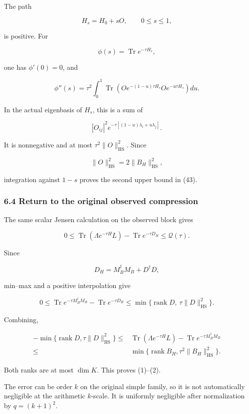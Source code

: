 \documentclass[11pt]{article}
\begin{document}
The path

\[
H_s=H_0+sO,\qquad 0\le s\le1,
\]

is positive. For

\[
\phi(s)=\operatorname{Tr}e^{-\tau H_s},
\]

one has \(\phi'(0)=0\), and

\[
\phi''(s)
=
\tau^2\int_0^1
\operatorname{Tr}
\left(
Oe^{-(1-u)\tau H_s}Oe^{-u\tau H_s}
\right)du.
\]

In the actual eigenbasis of \(H_s\), this is a sum of

\[
|O_{ij}|^2e^{-\tau[(1-u)\lambda_i+u\lambda_j]}.
\]

It is nonnegative and at most \(\tau^2\|O\|_{\mathrm{HS}}^2\). Since

\[
\|O\|_{\mathrm{HS}}^2=2\|B_H\|_{\mathrm{HS}}^2,
\]

integration against \(1-s\) proves the second upper bound in (43).

\subsubsection{6.4 Return to the original observed compression}\label{return-to-the-original-observed-compression}

The same scalar Jensen calculation on the observed block gives

\[
0\le
\operatorname{Tr}\!\left(\Lambda e^{-\tau H}L\right)
-\operatorname{Tr}e^{-\tau D_H}
\le\mathcal Q(\tau).
\tag{44}
\]

Since

\[
D_H=M_B^\dagger M_B+D^\dagger D,
\]

min--max and a positive interpolation give

\[
0\le
\operatorname{Tr}e^{-\tau M_B^\dagger M_B}
-\operatorname{Tr}e^{-\tau D_H}
\le
\min\{\operatorname{rank}D,\ \tau\|D\|_{\mathrm{HS}}^2\}.
\]

Combining,

\[
\boxed{
\begin{aligned}
-\min\{\operatorname{rank}D,\tau\|D\|_{\mathrm{HS}}^2\}
\le{}&
\operatorname{Tr}\!\left(\Lambda e^{-\tau H}L\right)
-\operatorname{Tr}e^{-\tau M_B^\dagger M_B}\\
\le{}&
\min\{\operatorname{rank}B_H,\tau^2\|B_H\|_{\mathrm{HS}}^2\}.
\end{aligned}}
\tag{45}
\]

Both ranks are at most \(\dim K\). This proves (1)--(2).

The error can be order \(k\) on the original simple family, so it is not automatically negligible at the arithmetic \(k\)-scale. It is uniformly negligible after normalization by \(q=(k+1)^2\).
\end{document}
